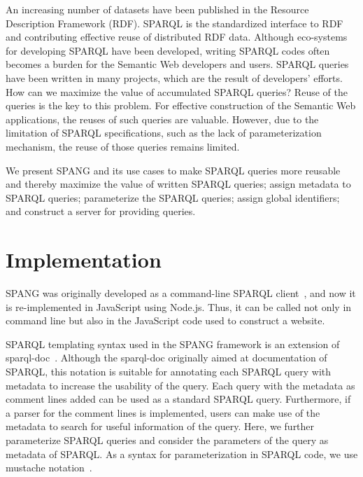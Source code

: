 \documentclass[runningheads]{llncs}
\begin{document}
An increasing number of datasets have been published in the Resource Description Framework (RDF).
SPARQL is the standardized interface to RDF and contributing effective reuse of distributed RDF data. 
Although eco-systems for developing SPARQL have been developed, writing SPARQL codes often becomes a burden for the Semantic Web developers and users. 
SPARQL queries have been written in many projects, which are the result of developers' efforts. 
How can we maximize the value of accumulated SPARQL queries?
Reuse of the queries is the key to this problem.
For effective construction of the Semantic Web applications, the reuses of such queries are valuable.
However, due to the limitation of SPARQL specifications, such as the lack of parameterization mechanism, the reuse of those queries remains limited. 


We present SPANG and its use cases to make SPARQL queries more reusable and thereby maximize the value of written SPARQL queries;
assign metadata to SPARQL queries;
parameterize the SPARQL queries;
assign global identifiers; and
construct a server for providing queries.


\section{Implementation}

SPANG was originally developed as a command-line SPARQL client~\cite{spang}, and now it is re-implemented in JavaScript using Node.js. Thus, it can be called not only in command line but also in the JavaScript code used to construct a website.

SPARQL templating syntax used in the SPANG framework is an extension of sparql-doc~\cite{sparql-doc}. Although the sparql-doc originally aimed at documentation of SPARQL, this notation is suitable for annotating each SPARQL query with metadata to increase the usability of the query. Each query with the metadata as comment lines added can be used as a standard SPARQL query. Furthermore, if a parser for the comment lines is implemented, users can make use of the metadata to search for useful information of the query.
Here, we further parameterize SPARQL queries and consider the parameters of the query as metadata of SPARQL.
As a syntax for parameterization in SPARQL code, we use mustache notation~\cite{mustache}.
\end{document}
